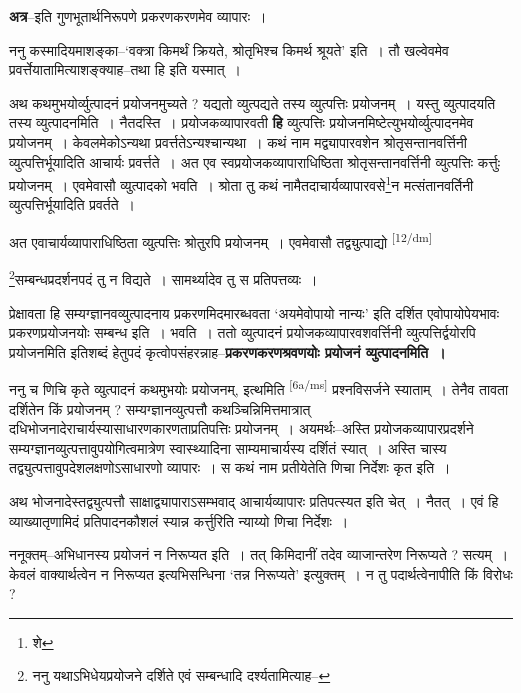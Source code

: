 \documentclass[article,12pt,a4paper]{memoir}
\begin{document}
	  \pstart \textbf{अत्र}--इति गुणभूतार्थनिरूपणे प्रकरणकरणमेव व्यापारः ।
	\pend
      

	  \pstart ननु कस्मादियमाशङ्का--‘वक्त्रा किमर्थं क्रियते, श्रोतृभिश्च किमर्थ श्रूयते’ इति । तौ खल्वेवमेव प्रवर्त्तेयातामित्याशङ्क्याह--तथा हि इति यस्मात् ।
	\pend
      

	  \pstart अथ कथमुभयोर्व्युत्पादनं प्रयोजनमुच्यते ? यद्यतो व्युत्पद्यते तस्य व्युत्पत्तिः प्रयोजनम् । यस्तु व्युत्पादयति तस्य व्युत्पादनमिति । नैतदस्ति । प्रयोजकव्यापारवती \textbf{हि} व्युत्पत्तिः प्रयोजनमिष्टेत्युभयोर्व्युत्पादनमेव प्रयोजनम् । केवलमेकोऽन्यथा प्रवर्त्ततेऽन्यश्चान्यथा । कथं नाम मद्व्यापारवशेन श्रोतृसन्तानवर्त्तिनी व्युत्पत्तिर्भूयादिति आचार्यः प्रवर्त्तते । अत एव स्वप्रयोजकव्यापाराधिष्ठिता श्रोतृसन्तानवर्त्तिनी व्युत्पत्तिः कर्त्तुः प्रयोजनम् । एवमेवासौ व्युत्पादको भवति । श्रोता तु कथं नामैतदाचार्यव्यापारवसे\footnote{शे}न मत्संतानवर्तिनी व्युत्पत्तिर्भूयादिति प्रवर्तते ।
	\pend
      

	  \pstart अत एवाचार्यव्यापाराधिष्ठिता व्युत्पत्तिः श्रोतुरपि प्रयोजनम् । एवमेवासौ तद्व्युत्पाद्यो  \leavevmode\textsuperscript{\rmlatinfont\tiny [12/dm]} 
	  
	\footnote{ननु यथाऽभिधेयप्रयोजने दर्शिते एवं सम्बन्धादि दर्श्यतामित्याह--\cite{dp-msD-n}}सम्बन्धप्रदर्शनपदं तु न विद्यते । सामर्थ्यादेव तु स प्रतिपत्तव्यः । 
	  
	प्रेक्षावता हि सम्यग्ज्ञानवव्युत्पादनाय प्रकरणमिदमारब्धवता ‘अयमेवोपायो नान्यः’ इति दर्शित एवोपायोपेयभावः प्रकरणप्रयोजनयोः सम्बन्ध इति । भवति । ततो व्युत्पादनं प्रयोजकव्यापारवशवर्त्तिनी व्युत्पत्तिर्द्वयोरपि प्रयोजनमिति इतिशब्दं हेतुपदं कृत्वोपसंहरन्नाह--\textbf{प्रकरणकरणश्रवणयोः प्रयोजनं व्युत्पादनमिति ।}
	\pend
      

	  \pstart ननु च णिचि कृते व्युत्पादनं कथमुभयोः प्रयोजनम्, इत्थमिति \leavevmode\textsuperscript{\rmlatinfont\tiny [6a/ms]} प्रश्नविसर्जने स्याताम् । तेनैव तावता दर्शितेन किं प्रयोजनम् ? सम्यग्ज्ञानव्युत्पत्तौ कथञ्चिन्निमित्तमात्रात् दधिभोजनादेराचार्यस्यासाधारणकारणताप्रतिपत्तिः प्रयोजनम् । अयमर्थः--अस्ति प्रयोजकव्यापारप्रदर्शने सम्यग्ज्ञानव्युत्पत्तावुपयोगित्वमात्रेण स्वास्थ्यादिना साम्यमाचार्यस्य दर्शितं स्यात् । अस्ति चास्य तद्व्युत्पत्तावुपदेशलक्षणोऽसाधारणो व्यापारः । स कथं नाम प्रतीयेतेति णिचा निर्देशः कृत इति ।
	\pend
      

	  \pstart अथ भोजनादेस्तद्व्युत्पत्तौ साक्षाद्व्यापाराऽसम्भवाद् आचार्यव्यापारः प्रतिपत्स्यत इति चेत् । नैतत् । एवं हि व्याख्यातृणामिदं प्रतिपादनकौशलं स्यान्न कर्त्तुरिति न्याय्यो णिचा निर्देशः ।
	\pend
      

	  \pstart ननूक्तम्--अभिधानस्य प्रयोजनं न निरूप्यत इति । तत् किमिदानीं तदेव व्याजान्तरेण निरूप्यते ? सत्यम् । केवलं वाक्यार्थत्वेन न निरूप्यत इत्यभिसन्धिना ‘तन्न निरूप्यते’ इत्युक्तम् । न तु पदार्थत्वेनापीति किं विरोधः ?
	\pend
      
\end{document}
